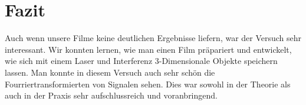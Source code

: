 \chapter{Fazit}
Auch wenn unsere Filme keine deutlichen Ergebnisse liefern, war der Versuch sehr interessant. 
Wir konnten lernen, wie man einen Film präpariert und entwickelt, wie sich mit einem Laser und Interferenz 3-Dimensionale Objekte speichern lassen.
Man konnte in diesem Versuch auch sehr schön die Fourriertransformierten von Signalen sehen. 
Dies war sowohl in der Theorie als auch in der Praxis sehr aufschlussreich und voranbringend.
